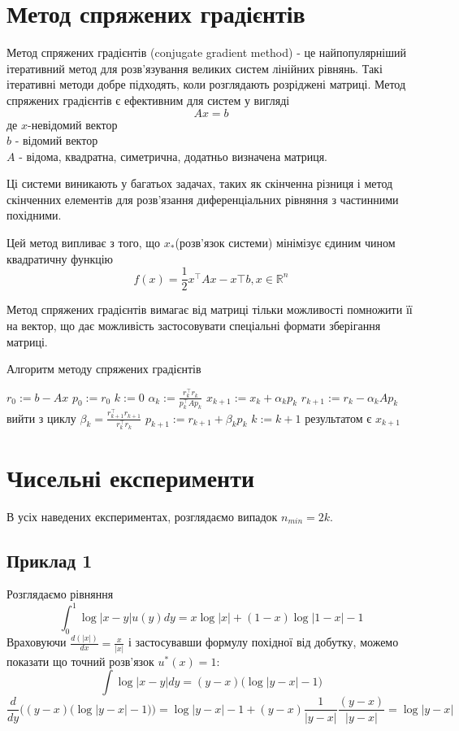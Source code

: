 \documentclass[12pt]{report}
\begin{document}
	\section{Метод спряжених градієнтів}
	\hspace{0.8cm} Метод спряжених градієнтів (conjugate gradient method) - це найпопулярніший ітеративний метод для розв'язування великих систем лінійних рівнянь. Такі ітеративні методи добре підходять, коли розглядають розріджені матриці. Метод спряжених градієнтів є ефективним для систем у вигляді $$Ax=b$$
	де $x$-невідомий вектор\\
	$b$ - відомий вектор\\
	$A$ - відома, квадратна, симетрична, додатньо визначена матриця.\par Ці системи виникають у багатьох задачах, таких як скінченна різниця і метод скінченних елементів для розв'язання диференціальних рівняння з частинними похідними.
	\par Цей метод випливає з того, що $x_{*}$(розв'язок системи) мінімізує єдиним чином квадратичну функцію
	$$f(x)=\frac{1}{2}x^\top Ax-x\top b, x\in\mathbb{R}^n$$
	\par Метод спряжених градієнтів вимагає від матриці тільки можливості помножити її на вектор, що дає можливість застосовувати спеціальні формати зберігання матриці.
	\begin{algorithm}
	\caption{Алгоритм методу спряжених градієнтів}
	\begin{algorithmic}
		\STATE $r_0:=b-Ax$
		\STATE $p_0:=r_0$
		\STATE $k:=0$
			\STATE $\alpha_k:=\frac{r_k^{\intercal}r_k}{p_k^{\intercal}Ap_k}$
			\STATE $x_{k+1}:=x_k+\alpha_kp_k$
			\STATE $r_{k+1}:=r_k-\alpha_kAp_k$
				\STATE вийти з циклу
			\ENDIF
			\STATE $\beta_k=\frac{r_{k+1}^{\intercal}r_{k+1}}{r_k^\intercal r_k}$
			\STATE $p_{k+1}:=r_{k+1}+\beta_kp_k$
			\STATE $k:=k+1$
		\ENDWHILE
		\STATE результатом є $x_{k+1}$
	\end{algorithmic}
	
	\end{algorithm}
	\section{Чисельні експерименти}
	\hspace{0.8cm}В усіх наведених експериментах, розглядаємо випадок $n_{min}=2k$.
	\subsection{Приклад 1}
	\hspace{0.8cm}Розглядаємо рівняння
	$$\int_{0}^{1}\log|x-y|u(y)dy = x\log|x|+(1-x)\log|1-x|-1$$
	Враховуючи $\frac{d(|x|)}{dx}=\frac{x}{|x|}$ і застосувавши формулу похідної від добутку, можемо показати що точний розв'язок $u^{*}(x)=1$:
	$$\int \log|x-y|dy=(y-x)\big(\log|y-x|-1\big)$$
	$$\frac{d}{dy}\Bigg((y-x)\big(\log|y-x|-1\big)\Bigg)=\log|y-x|-1+(y-x)\frac{1}{|y-x|}\frac{(y-x)}{|y-x|}=\log|y-x|$$
\end{document}
